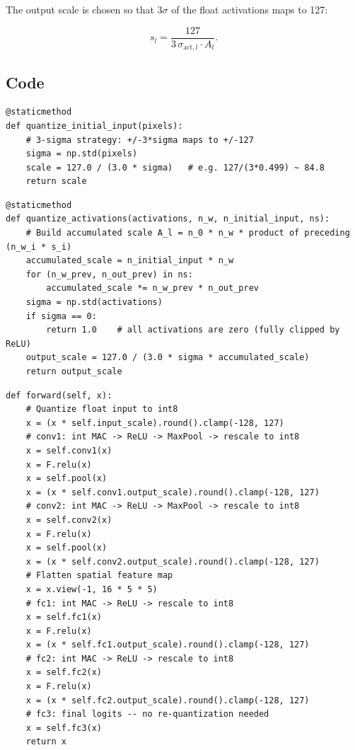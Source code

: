 \documentclass[11pt, letterpaper]{article}
\begin{document}
The output scale is chosen so that $3\sigma$ of the float activations maps to 127:

\begin{equation}
  s_l = \frac{127}{3\,\sigma_{\mathrm{act},l} \cdot A_l}.
  \label{eq:output_scale}
\end{equation}

\subsection{Code}

\begin{lstlisting}[caption={Scale for the initial input --- \texttt{quantize\_initial\_input}.}]
@staticmethod
def quantize_initial_input(pixels):
    # 3-sigma strategy: +/-3*sigma maps to +/-127
    sigma = np.std(pixels)
    scale = 127.0 / (3.0 * sigma)   # e.g. 127/(3*0.499) ~ 84.8
    return scale
\end{lstlisting}

\begin{lstlisting}[caption={Per-layer output scale --- \texttt{quantize\_activations}.}]
@staticmethod
def quantize_activations(activations, n_w, n_initial_input, ns):
    # Build accumulated scale A_l = n_0 * n_w * product of preceding (n_w_i * s_i)
    accumulated_scale = n_initial_input * n_w
    for (n_w_prev, n_out_prev) in ns:
        accumulated_scale *= n_w_prev * n_out_prev
    sigma = np.std(activations)
    if sigma == 0:
        return 1.0    # all activations are zero (fully clipped by ReLU)
    output_scale = 127.0 / (3.0 * sigma * accumulated_scale)
    return output_scale
\end{lstlisting}

\begin{lstlisting}[caption={Quantized forward pass --- \texttt{NetQuantized.forward}.}]
def forward(self, x):
    # Quantize float input to int8
    x = (x * self.input_scale).round().clamp(-128, 127)
    # conv1: int MAC -> ReLU -> MaxPool -> rescale to int8
    x = self.conv1(x)
    x = F.relu(x)
    x = self.pool(x)
    x = (x * self.conv1.output_scale).round().clamp(-128, 127)
    # conv2: int MAC -> ReLU -> MaxPool -> rescale to int8
    x = self.conv2(x)
    x = F.relu(x)
    x = self.pool(x)
    x = (x * self.conv2.output_scale).round().clamp(-128, 127)
    # Flatten spatial feature map
    x = x.view(-1, 16 * 5 * 5)
    # fc1: int MAC -> ReLU -> rescale to int8
    x = self.fc1(x)
    x = F.relu(x)
    x = (x * self.fc1.output_scale).round().clamp(-128, 127)
    # fc2: int MAC -> ReLU -> rescale to int8
    x = self.fc2(x)
    x = F.relu(x)
    x = (x * self.fc2.output_scale).round().clamp(-128, 127)
    # fc3: final logits -- no re-quantization needed
    x = self.fc3(x)
    return x
\end{lstlisting}
\end{document}
